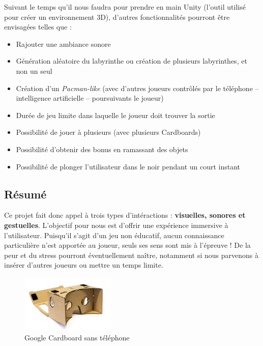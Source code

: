 Suivant le temps qu'il nous faudra pour prendre en main Unity (l'outil utilisé pour créer un environnement 3D), d'autres fonctionnalités pourront être envisagées telles que :
\begin{itemize}
  \item Rajouter une ambiance sonore
  \item Génération aléatoire du labyrinthe ou création de plusieurs labyrinthes, et non un seul
  \item Création d'un \textit{Pacman-like} (avec d'autres joueurs contrôlés par le téléphone -- intelligence artificielle -- poursuivants le joueur)
  \item Durée de jeu limite dans laquelle le joueur doit trouver la sortie
  \item Possibilité de jouer à plusieurs (avec plusieurs Cardboards)
  \item Possibilité d'obtenir des bonus en ramassant des objets
  \item Possibilité de plonger l'utilisateur dans le noir pendant un court instant
\end{itemize}

\subsection{Résumé}
Ce projet fait donc appel à trois types d'intéractions : \textbf{visuelles, sonores et gestuelles}. L'objectif pour nous est d'offrir une expérience immersive à l'utilisateur. Puisqu'il s'agit d'un jeu non éducatif, aucun connaissance particulière n'est apportée au joueur, seuls ses sens sont mis à l'épreuve ! De la peur et du stress pourront éventuellement naître, notamment si nous parvenons à insérer d'autres joueurs ou mettre un temps limite.

\begin{figure}[h!]
  \centering
  \includegraphics[width=0.4\textwidth]{res/img/cardboard2.jpg}
  \caption{Google Cardboard sans téléphone}
\end{figure}